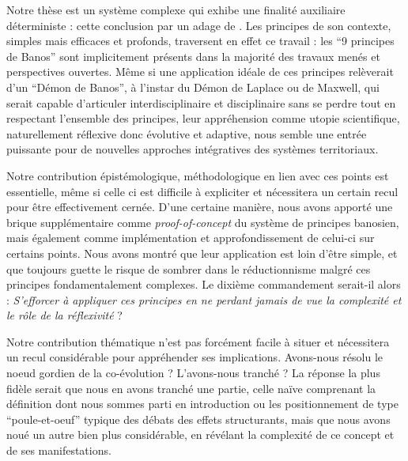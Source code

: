 


Notre thèse est un système complexe qui exhibe une finalité auxiliaire déterministe : cette conclusion par un adage de . Les principes de son contexte, simples mais efficaces et profonds, traversent en effet ce travail : les ``9 principes de Banos'' sont implicitement présents dans la majorité des travaux menés et perspectives ouvertes. Même si une application idéale de ces principes relèverait d'un ``Démon de Banos'', à l'instar du Démon de Laplace ou de Maxwell, qui serait capable d'articuler interdisciplinaire et disciplinaire sans se perdre tout en respectant l'ensemble des principes, leur appréhension comme utopie scientifique, naturellement réflexive donc évolutive et adaptive, nous semble une entrée puissante pour de nouvelles approches intégratives des systèmes territoriaux. 


Notre contribution épistémologique, méthodologique en lien avec ces points est essentielle, même si celle ci est difficile à expliciter et nécessitera un certain recul pour être effectivement cernée. D'une certaine manière, nous avons apporté une brique supplémentaire comme \emph{proof-of-concept} du système de principes banosien, mais également comme implémentation et approfondissement de celui-ci sur certains points. Nous avons montré que leur application est loin d'être simple, et que toujours guette le risque de sombrer dans le réductionnisme malgré ces principes fondamentalement complexes. Le dixième commandement serait-il alors : \textit{S'efforcer à appliquer ces principes en ne perdant jamais de vue la complexité et le rôle de la réflexivité} ?


Notre contribution thématique n'est pas forcément facile à situer et nécessitera un recul considérable pour appréhender ses implications. Avons-nous résolu le noeud gordien de la co-évolution ? L'avons-nous tranché ? La réponse la plus fidèle serait que nous en avons tranché une partie, celle naïve comprenant la définition dont nous sommes parti en introduction ou les positionnement de type ``poule-et-oeuf'' typique des débats des effets structurants, mais que nous avons noué un autre bien plus considérable, en révélant la complexité de ce concept et de ses manifestations.


